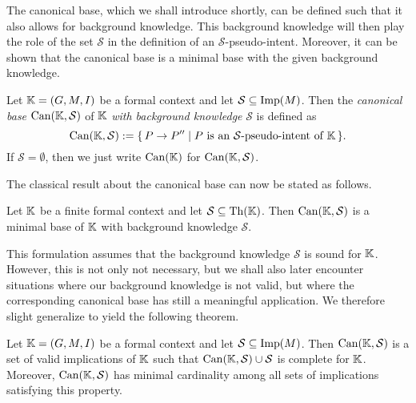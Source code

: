 The canonical base, which we shall introduce shortly, can be defined such that it also
allows for background knowledge.  This background knowledge will then play the role of the
set $\mathcal{S}$ in the definition of an $\mathcal{S}$-pseudo-intent.  Moreover, it can
be shown that the canonical base is a minimal base with the given background knowledge.

\begin{Definition}
  \label{def:canonical-base}
  Let ${\mathbb{K}} = (G, M, I)$ be a formal context and let $\mathcal{S} \subseteq \operatorname{Imp}(M)$.
  Then the \emph{canonical base} $\operatorname{Can}({\mathbb{K}}, \mathcal{S})$ of ${\mathbb{K}}$ \emph{with
    background knowledge} $\mathcal{S}$ is defined as
  \begin{equation*}
    \operatorname{Can}({\mathbb{K}}, \mathcal{S}) := {\{\, P \to P'' \mid P \text{ is an } \mathcal{S}
      \text{-pseudo-intent of } {\ensuremath{\mathbb{K}}} \,\}}.
  \end{equation*}
  If $\mathcal{S} = \emptyset$, then we just write $\operatorname{Can}({\mathbb{K}})$ for $\operatorname{Can}({\mathbb{K}},
  \mathcal{S})$.
\end{Definition}

The classical result about the canonical base can now be stated as follows.

\begin{Theorem}
  \label{thm:canonical-base-with-valid-background-knowledge}
  Let ${\mathbb{K}}$ be a finite formal context and let $\mathcal{S} \subseteq \operatorname{Th}({\mathbb{K}})$.
  Then $\operatorname{Can}({\mathbb{K}}, \mathcal{S})$ is a minimal base of ${\mathbb{K}}$ with background knowledge
  $\mathcal{S}$.
\end{Theorem}

This formulation assumes that the background knowledge $\mathcal{S}$ is sound for ${\mathbb{K}}$.  However, this is not only not necessary, but we shall also later encounter situations
where our background knowledge is not valid, but where the corresponding canonical base
has still a meaningful application.  We therefore slight generalize
 to yield the following theorem.

\begin{Theorem}
  \label{thm:canonical-base-with-arbitrary-background-knowledge}
  Let ${\mathbb{K}} = (G, M, I)$ be a formal context and let $\mathcal{S} \subseteq \operatorname{Imp}(M)$.
  Then $\operatorname{Can}({\mathbb{K}}, \mathcal{S})$ is a set of valid implications of ${\mathbb{K}}$ such that
  $\operatorname{Can}({\mathbb{K}}, \mathcal{S}) \cup \mathcal{S}$ is complete for ${\mathbb{K}}$.  Moreover,
  $\operatorname{Can}({\mathbb{K}}, \mathcal{S})$ has minimal cardinality among all sets of implications
  satisfying this property.
\end{Theorem}

